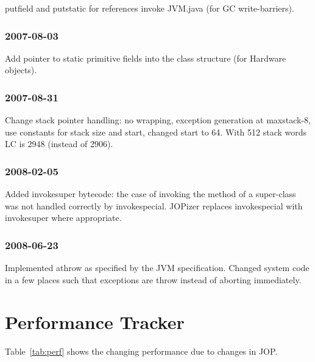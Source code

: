 \documentclass[a4paper,12pt]{scrartcl}
\begin{document}
putfield and putstatic for references invoke JVM.java (for GC
write-barriers).

\subsubsection*{2007-08-03}

Add pointer to static primitive fields into the class structure (for
Hardware objects).

\subsubsection*{2007-08-31}

Change stack pointer handling: no wrapping, exception generation at
maxstack-8, use constants for stack size and start, changed start to
64. With 512 stack words LC is 2948 (instead of 2906).

\subsubsection*{2008-02-05}

Added invokesuper bytecode: the case of invoking the method of a
super-class was not handled correctly by invokespecial. JOPizer
replaces invokespecial with invokesuper where appropriate.

\subsubsection*{2008-06-23}

Implemented athrow as specified by the JVM specification. Changed
system code in a few places such that exceptions are throw instead of
aborting immediately.

\section{Performance Tracker}

Table~\ref{tab:perf} shows the changing performance due to changes
in JOP.
\end{document}
